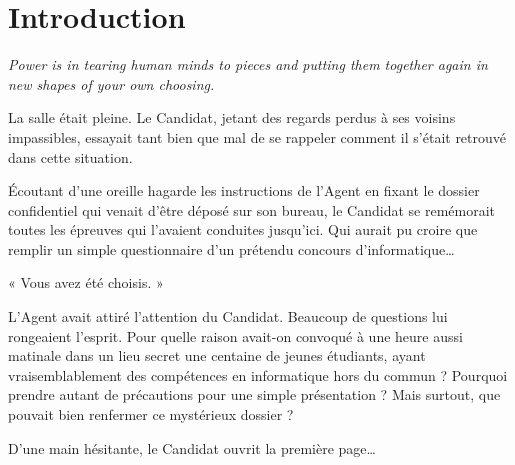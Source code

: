 \section{Introduction}

\emph{Power is in tearing human minds to pieces and putting them together again
in new shapes of your own choosing.}

\vspace{1cm}

La salle était pleine. Le Candidat, jetant des regards perdus à ses voisins
impassibles, essayait tant bien que mal de se rappeler comment il s'était
retrouvé dans cette situation.

Écoutant d'une oreille hagarde les instructions de l'Agent en fixant le dossier
confidentiel qui venait d'être déposé sur son bureau, le Candidat se remémorait
toutes les épreuves qui l'avaient conduites jusqu'ici. Qui aurait pu croire que
remplir un simple questionnaire d'un prétendu concours
d'informatique\ldots

« Vous avez été choisis. »

L'Agent avait attiré l'attention du Candidat. Beaucoup de questions lui
rongeaient l'esprit. Pour quelle raison avait-on convoqué à une heure aussi
matinale dans un lieu secret une centaine de jeunes étudiants, ayant
vraisemblablement des compétences en informatique hors du commun ? Pourquoi
prendre autant de précautions pour une simple présentation ? Mais surtout, que
pouvait bien renfermer ce mystérieux dossier ?

D'une main hésitante, le Candidat ouvrit la première page\ldots

\newpage

